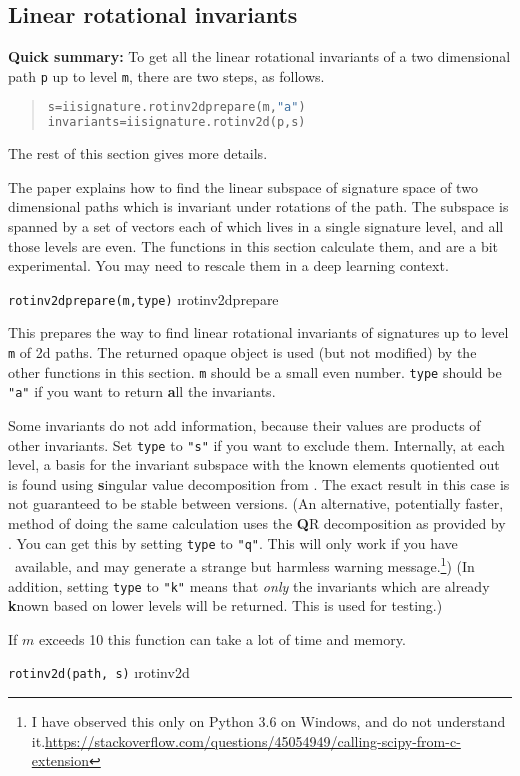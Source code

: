 \documentclass[a4paper]{extarticle}
\newenvironment{defn}{\begin{adjustwidth}{1cm}{}\ignorespaces}{\end{adjustwidth}\ignorespacesafterend}
\begin{document}
\subsection{Linear rotational invariants}
\begin{center}
	\begin{minipage}{0.7\textwidth}
		\noindent\textbf{Quick summary:} To get all the linear rotational invariants of a two dimensional path \verb!p! up to level \verb!m!, there are two steps, as follows.
		\begin{quotation}
\begin{lstlisting}[language=Python,keywordstyle=\bf]
s=iisignature.rotinv2dprepare(m,"a")
invariants=iisignature.rotinv2d(p,s)
\end{lstlisting}
		\end{quotation}
		The rest of this section gives more details.
	\end{minipage}
\end{center}

The paper \cite{JD} explains how to find the linear subspace of signature space of two dimensional paths which is invariant under rotations of the path. The subspace is spanned by a set of vectors each of which lives in a single signature level, and all those levels are even. The functions in this section calculate them, and are a bit experimental. You may need to rescale them in a deep learning context. 

\verb!rotinv2dprepare(m,type)! \i{rotinv2dprepare}
\begin{defn}
	\nopagebreak This prepares the way to find linear rotational invariants of signatures up to level \verb|m| of 2d paths. The returned opaque object is used (but not modified) by the other functions in this section. \verb|m| should be a small even number. \verb|type| should be \verb|"a"| if you want to return \textbf{a}ll the invariants.
	
	Some invariants do not add information, because their values are products of other invariants. Set \verb|type| to \verb|"s"| if you want to exclude them. Internally, at each level, a basis for the invariant subspace with the known elements quotiented out is found using \textbf{s}ingular value decomposition from \numpy. The exact result in this case is not guaranteed to be stable between versions. (An alternative, potentially faster, method of doing the same calculation uses the \textbf{Q}R decomposition as provided by \scipy. You can get this by setting \verb|type| to \verb|"q"|. This will only work if you have \scipy\ available, and may generate a strange but harmless warning message.\footnote{I have observed this only on Python 3.6 on Windows, and do not understand it.\url{https://stackoverflow.com/questions/45054949/calling-scipy-from-c-extension}}) (In addition, setting \verb|type| to \verb|"k"| means that \emph{only} the invariants which are already \textbf{k}nown based on lower levels will be returned. This is used for testing.)
	
	If $m$ exceeds 10 this function can take a lot of time and memory.
\end{defn}
\verb!rotinv2d(path, s)! \i{rotinv2d}
\end{document}
